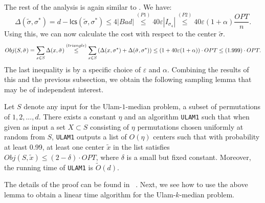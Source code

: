 \documentclass[11pt]{llncs}
\newcommand{\veps}{\varepsilon}
\newcommand{\lcs}{{\textsf{lcs}}}
\begin{document}
The rest of the analysis is again similar to \cite{cdk23}. We have:
$$
\Delta(\tilde{\sigma}, \sigma^*) = d - \lcs(\tilde{\sigma}, \sigma^*) \leq 4 |Bad| \stackrel{(P1)}{\leq} 40 \veps |I_{\sigma_4}| \stackrel{(P2)}{\leq} 40 \veps (1 + \alpha) \frac{OPT}{n}.
$$
Using this, we can now calculate the cost with respect to the center $\tilde{\sigma}$.
$$
Obj(S, \tilde{\sigma}) = \sum_{x \in S} \Delta(x, \tilde{\sigma}) 
\stackrel{(triangle)}{\leq} \sum_{x \in S} \left( \Delta(x, \sigma^*) + \Delta(\tilde{\sigma}, \sigma^*)\right)
\leq \left( 1 + 40 \veps (1+\alpha)\right) \cdot OPT \\
\leq (1.999) \cdot OPT.
$$
The last inequality is by a specific choice of $\veps$ and $\alpha$. Combining the results of this and the previous subsection, we obtain the following sampling lemma that may be of independent interest.

\begin{lemma}
Let $S$ denote any input for the Ulam-$1$-median problem, a subset of permutations of $1, 2, ..., d$. There exists a constant $\eta$ and an algorithm {\tt ULAM1} such that when given as input a set $X \subset S$ consisting of $\eta$ permutations chosen uniformly at random from $S$, {\tt ULAM1} outputs a list of $O(\eta)$ centers such that with probability at least 0.99, at least one center $\tilde{x}$ in the list satisfies $Obj(S, \tilde{x}) \leq (2-\delta) \cdot OPT$, where $\delta$ is a small but fixed constant. Moreover, the running time of {\tt ULAM1} is $\tilde{O}(d)$.
\end{lemma}
The details of the proof can be found in ~.
Next, we see how to use the above lemma to obtain a linear time algorithm for the Ulam-$k$-median problem.
\end{document}
